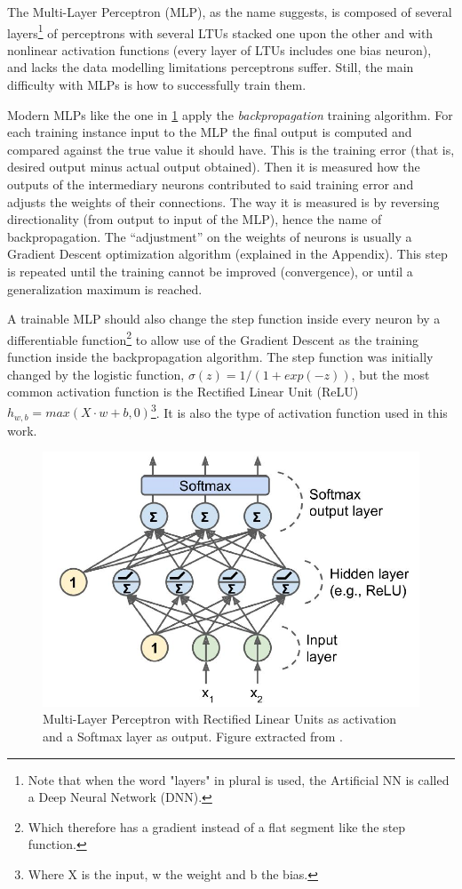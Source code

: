 \documentclass[../main.tex]{subfiles}
\begin{document}
The Multi-Layer Perceptron (MLP), as the name suggests, is composed of several layers\footnote{Note that when the word "layers" in plural is used, the Artificial NN is called a Deep Neural Network (DNN).} of perceptrons with several LTUs stacked one upon the other and with nonlinear activation functions (every layer of LTUs includes one bias neuron), and lacks the data modelling limitations perceptrons suffer. Still, the main difficulty with MLPs is how to successfully train them.

Modern MLPs like the one in \ref{fig:MLP_with_RELU_and_Softmax} apply the \textit{backpropagation} training algorithm. For each training instance input to the MLP the final output is computed and compared against the true value it should have. This is the training error (that is, desired output minus actual output obtained). Then it is measured how the outputs of the intermediary neurons contributed to said training error and adjusts the weights of their connections. The way it is measured is by reversing directionality (from output to input of the MLP), hence the name of backpropagation. The ``adjustment'' on the weights of neurons is usually a Gradient Descent optimization algorithm (explained in the Appendix). This step is repeated until the training cannot be improved (convergence), or until a generalization maximum is reached.

A trainable MLP should also change the step function inside every neuron by a differentiable function\footnote{Which therefore has a gradient instead of a flat segment like the step function.} to allow use of the Gradient Descent as the training function inside the backpropagation algorithm. The step function was initially changed by the logistic function, $\sigma(z) = 1 / (1 + exp(-z))$, but the most common activation function is the Rectified Linear Unit (ReLU) $h_{w, b} = max(X \cdot w + b, 0)$\footnote{Where X is the input, w the weight and b the bias.}. It is also the type of activation function used in this work.

\begin{figure}[H]
    \centering
    \includegraphics[width=0.7\linewidth]{images/MLP_with_RELU_and_Softmax.JPG}
    \caption{Multi-Layer Perceptron with Rectified Linear Units as activation and a Softmax layer as output. Figure extracted from \cite{hands_on_ML_Aurelien}.}
    \label{fig:MLP_with_RELU_and_Softmax}
\end{figure}
\end{document}
